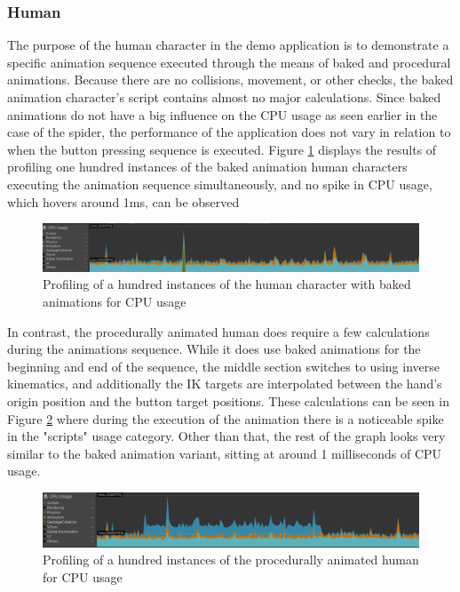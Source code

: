\subsubsection{Human}
The purpose of the human character in the demo application is to demonstrate
a specific animation sequence executed through the means of baked and procedural
animations. Because there are no collisions, movement, or other checks, the baked
animation character's script contains almost no major calculations. Since
baked animations do not have a big influence on the CPU usage as seen earlier in
the case of the spider, the performance of the application does not vary in
relation to when the button pressing sequence is executed. Figure
\ref{fig:pr_h_b} displays the results of profiling one hundred instances of the
baked animation human characters executing the animation sequence
simultaneously, and no spike in CPU usage, which hovers around 1ms, can be
observed

\begin{figure}[h!]
    \centering
    \captionsetup{justification=centering}
    \includegraphics[width=\textwidth]{grafika/pr_h_b.png}
    \caption{Profiling of a hundred instances of the human character with baked
    animations for CPU usage}
    \label{fig:pr_h_b}
\end{figure}

In contrast, the procedurally animated human does require a few calculations
during the animations sequence. While it does use baked animations for the
beginning and end of the sequence, the middle section switches to using inverse
kinematics, and additionally the IK targets are interpolated between the hand's
origin position and the button target positions. These calculations can be
seen in Figure \ref{fig:pr_h_ik} where during the execution of the animation
there is a noticeable spike in the "scripts" usage category. Other than that,
the rest of the graph looks very similar to the baked animation variant, sitting
at around 1 milliseconds of CPU usage.

\begin{figure}[h!]
    \centering
    \captionsetup{justification=centering}
    \includegraphics[width=\textwidth]{grafika/pr_h_ik.png}
    \caption{Profiling of a hundred instances of the procedurally animated human
    for CPU usage}
    \label{fig:pr_h_ik}
\end{figure}


